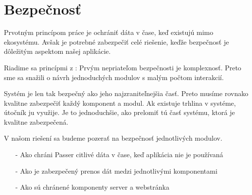 \section{Bezpečnosť}
Prvotným princípom práce je ochrániť dáta v čase, keď existujú mimo ekosystému. Avšak je potrebné zabezpečiť celé riešenie, keďže bezpečnosť je dôležitým aspektom našej aplikácie.

Riadime sa princípmi z \cite{practicalcryptography}: Prvým nepriateľom bezpečnosti je komplexnosť. Preto sme sa snažili o návrh jednoduchých modulov s malým počtom interakcií.

Systém je len tak bezpečný ako jeho najzraniteľnejšia časť. Preto musíme rovnako kvalitne zabezpečiť každý komponent a modul. Ak existuje trhlina v systéme, útočník ju využije. Je to jednoduchšie, ako prelomiť tú časť systému, ktorá je kvalitne zabezpečená. 

V našom riešení sa budeme pozerať na bezpečnosť jednotlivých modulov.
\begin{itemize}
    \item[-] Ako chráni Passer citlivé dáta v čase, keď aplikácia nie je používaná
    \item[-] Ako je zabezpečený prenos dát medzi jednotlivými komponentami
    \item[-] Ako sú chránené komponenty server a webstránka
\end{itemize}



